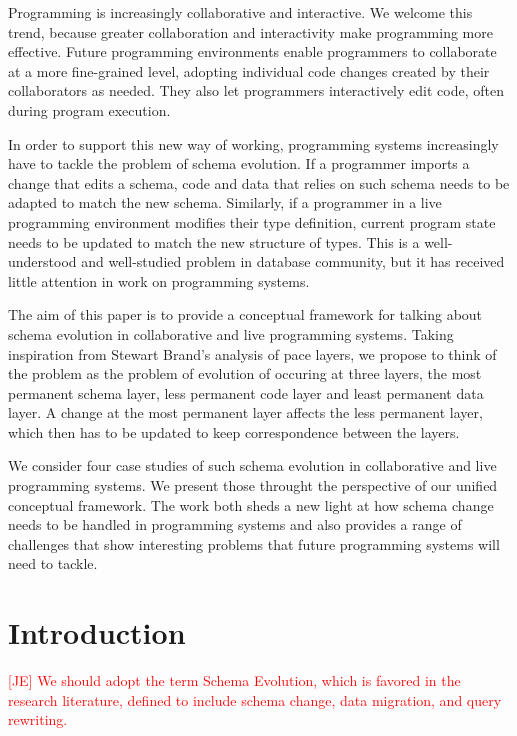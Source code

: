\documentclass[english,submission]{programming}
\begin{document}
Programming is increasingly collaborative and interactive. We welcome this trend, because
greater collaboration and interactivity make programming more effective. Future programming
environments enable programmers to collaborate at a more fine-grained level, adopting individual
code changes created by their collaborators as needed. They also let programmers interactively
edit code, often during program execution.

In order to support this new way of working, programming systems increasingly have to tackle the
problem of schema evolution. If a programmer imports a change that edits a schema, code and data
that relies on such schema needs to be adapted to match the new schema. Similarly, if a programmer
in a live programming environment modifies their type definition, current program state needs to
be updated to match the new structure of types. This is a well-understood and well-studied problem
in database community, but it has received little attention in work on programming systems.

The aim of this paper is to provide a conceptual framework for talking about schema evolution in
collaborative and live programming systems. Taking inspiration from Stewart Brand's analysis of
pace layers, we propose to think of the problem as the problem of evolution of occuring at three
layers, the most permanent schema layer, less permanent code layer and least permanent data layer.
A change at the most permanent layer affects the less permanent layer, which then has to be
updated to keep correspondence between the layers.

We consider four case studies of such schema evolution in collaborative and live programming
systems. We present those throught the perspective of our unified conceptual framework. The work
both sheds a new light at how schema change needs to be handled in programming systems and also
provides a range of challenges that show interesting problems that future programming systems
will need to tackle.


\section{Introduction}

\textcolor{red}{[JE] We should adopt the term Schema Evolution, which is favored in the research literature, defined to include schema change, data migration, and query rewriting. }
\end{document}
